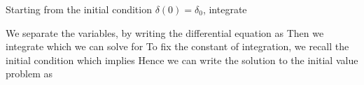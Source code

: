 Starting from the initial condition $\delta(0)=\delta_0$, integrate 

\solution 
We separate the variables, by writing the differential equation as 
Then we integrate 
which we can solve for
To fix the constant of integration, we recall the initial condition  
which implies 
Hence we can write the solution to the initial value problem as 


